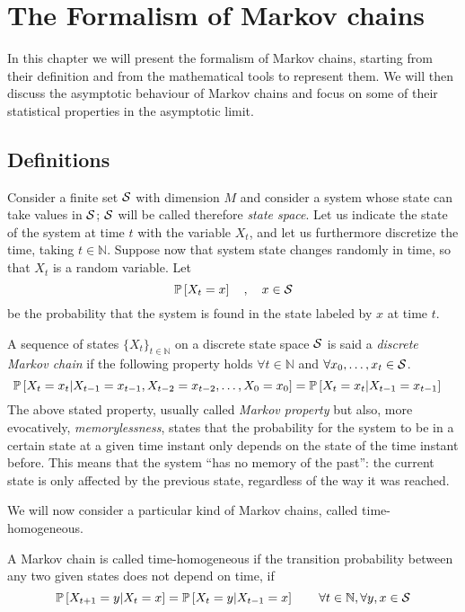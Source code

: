 \chapter{The Formalism of Markov chains}
In this chapter we will present the formalism of Markov chains, starting from their definition and from the mathematical tools to represent them. We will then discuss the asymptotic behaviour of Markov chains and focus on some of their statistical properties in the asymptotic limit.
\label{ch:markov_chains}
\section{Definitions}
Consider a finite set $\mathcal{S}$ with dimension $M$ and consider a system whose state can take values in $\mathcal{S}$; $\mathcal{S}$ will be called therefore \emph{state space}. Let us indicate the state of the system at time $t$ with the variable $X_t$, and let us furthermore discretize the time, taking $t \in \mathbb{N}$. Suppose now that system state changes randomly in time, so that $X_t$ is a random variable. Let
\begin{equation}
    \mathbb{P}\left[X_t = x\right] \quad , \quad x \in \mathcal{S}
\end{equation}
be the probability that the system is found in the state labeled by $x$ at time $t$.

\begin{ndef}  \label{def:markov-chain}
    A sequence of states $\{X_t\}_{t\in \mathbb{N}}$ on a discrete state space $\mathcal{S}$ is said a \emph{discrete Markov chain} if the following property holds $\forall t \in \mathbb N$ and $\forall x_0, \dots, x_t \in \mathcal{S}$.
    \begin{equation}
        \mathbb{P}\left[ X_t = x_t | X_{t-1} = x_{t-1}, X_{t-2} = x_{t-2}, \dots, X_0 = x_0 \right] = \mathbb{P}\left[ X_t = x_t | X_{t-1} = x_{t-1} \right] \quad
    \end{equation}
The above stated property, usually called \emph{Markov property} but also, more evocatively, \emph{memorylessness}, states that the probability for the system to be in a certain state at a given time instant only depends on the state of the time instant before. This means that the system \enquote{has no memory of the past}: the current state is only affected by the previous state, regardless of the way it was reached.
\end{ndef}

We will now consider a particular kind of Markov chains, called time-homogeneous.
\begin{ndef}  A Markov chain is called time-homogeneous if the transition probability between any two given states does not depend on time, \ie if
    \begin{equation}
        \mathbb{P}\left[X_{t+1} = y | X_{t} = x\right] = \mathbb{P}\left[X_{t} = y | X_{t-1} = x\right] \quad \quad \forall t\in \mathbb{N}, \forall y, x \in \mathcal{S}
    \end{equation}
\end{ndef}

